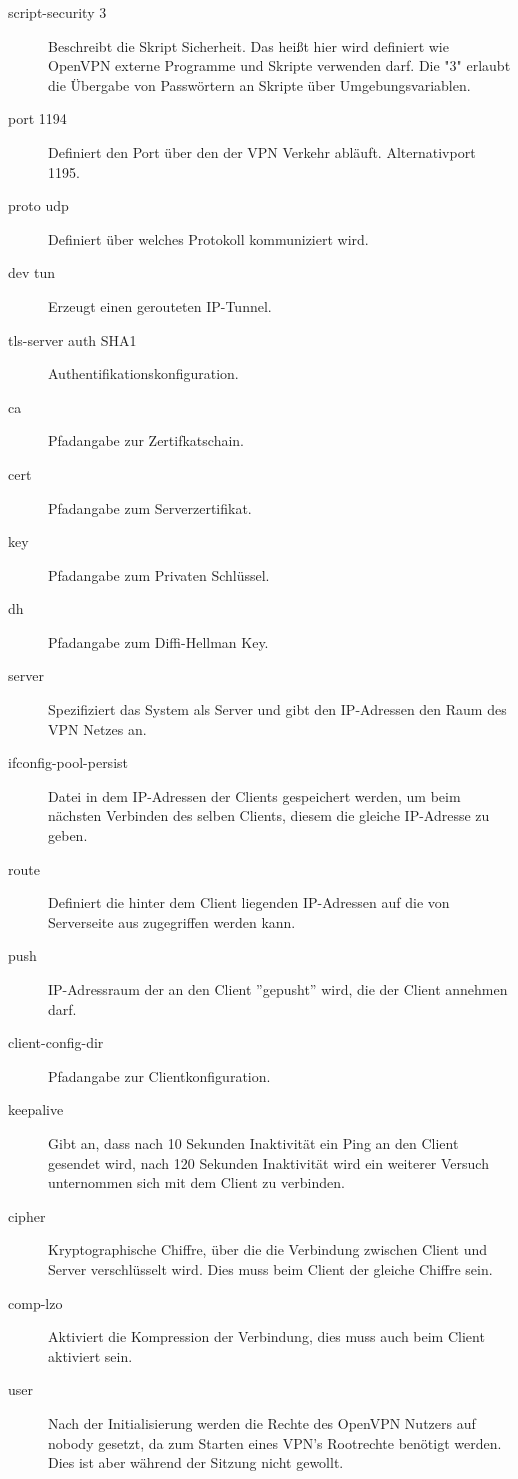 \begin{description}
	\item[script-security 3]
	Beschreibt die Skript Sicherheit. Das heißt hier wird definiert wie OpenVPN externe Programme und Skripte verwenden darf. Die "3" erlaubt die Übergabe von Passwörtern an Skripte über Umgebungsvariablen.
	\item[port 1194] Definiert den Port über den der VPN Verkehr abläuft. Alternativport 1195.
	\item[proto udp] Definiert über welches Protokoll kommuniziert wird. 
	\item[dev tun] Erzeugt einen gerouteten IP-Tunnel.
	\item[tls-server auth SHA1] Authentifikationskonfiguration.
	\item[ca] Pfadangabe zur Zertifkatschain.
	\item[cert] Pfadangabe zum Serverzertifikat.
	\item[key] Pfadangabe zum Privaten Schlüssel.
	\item[dh] Pfadangabe zum Diffi-Hellman Key.
	\item[server] Spezifiziert das System als Server und gibt den IP-Adressen den Raum des VPN Netzes an.	
	\item[ifconfig-pool-persist] Datei in dem IP-Adressen der Clients gespeichert werden, um beim nächsten Verbinden des selben Clients, diesem die gleiche IP-Adresse zu geben. 
	\item[route] Definiert die hinter dem Client liegenden IP-Adressen auf die von Serverseite aus zugegriffen werden kann.
	\item[push] IP-Adressraum der an den Client ''gepusht'' wird, die der Client annehmen darf. 
	\item[client-config-dir] Pfadangabe zur Clientkonfiguration.
	\item[keepalive] Gibt an, dass nach 10 Sekunden Inaktivität ein Ping an den Client gesendet wird, nach 120 Sekunden Inaktivität wird ein weiterer Versuch unternommen sich mit dem Client zu verbinden.
	\item[cipher] Kryptographische Chiffre, über die die Verbindung zwischen Client und Server verschlüsselt wird. Dies muss beim Client der gleiche Chiffre sein.
	\item[comp-lzo] Aktiviert die Kompression der Verbindung, dies muss auch beim Client aktiviert sein.
	\item[user] Nach der Initialisierung werden die Rechte des OpenVPN Nutzers auf nobody gesetzt, da zum Starten eines VPN's Rootrechte benötigt werden. Dies ist aber während der Sitzung nicht gewollt.

\end{description}

